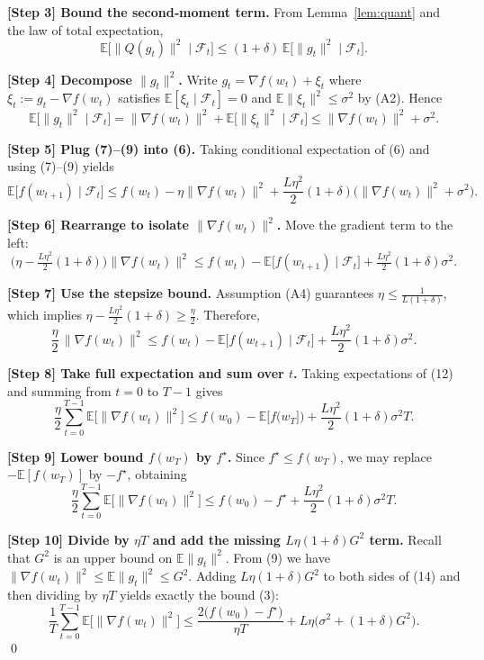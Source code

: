 \documentclass{article}
\begin{document}
\noindent\textbf{[Step 3] Bound the second‑moment term.}
From Lemma~\ref{lem:quant} and the law of total expectation,
\[
\mathbb{E}\!\big[\|Q(g_t)\|^2\mid\mathcal{F}_t\big]
\le (1+\delta)\,\mathbb{E}\!\big[\|g_t\|^2\mid\mathcal{F}_t\big].
\tag{8}
\]

\noindent\textbf{[Step 4] Decompose $\|g_t\|^2$.}
Write $g_t=\nabla f(w_t)+\xi_t$ where $\xi_t:=g_t-\nabla f(w_t)$ satisfies
$\mathbb{E}[\xi_t\mid\mathcal{F}_t]=0$ and
$\mathbb{E}\|\xi_t\|^2\le\sigma^2$ by (A2).  Hence
\[
\mathbb{E}\!\big[\|g_t\|^2\mid\mathcal{F}_t\big]
= \|\nabla f(w_t)\|^2 + \mathbb{E}\!\big[\|\xi_t\|^2\mid\mathcal{F}_t\big]
\le \|\nabla f(w_t)\|^2 + \sigma^2.
\tag{9}
\]

\noindent\textbf{[Step 5] Plug (7)–(9) into (6).}
Taking conditional expectation of (6) and using (7)–(9) yields
\[
\mathbb{E}\!\big[f(w_{t+1})\mid\mathcal{F}_t\big]
\le f(w_t)-\eta\|\nabla f(w_t)\|^2
+\frac{L\eta^2}{2}(1+\delta)\big(\|\nabla f(w_t)\|^2+\sigma^2\big).
\tag{10}
\]

\noindent\textbf{[Step 6] Rearrange to isolate $\|\nabla f(w_t)\|^2$.}
Move the gradient term to the left:
\[
\big(\eta-\tfrac{L\eta^2}{2}(1+\delta)\big)\|\nabla f(w_t)\|^2
\le f(w_t)-\mathbb{E}\!\big[f(w_{t+1})\mid\mathcal{F}_t\big]
+\tfrac{L\eta^2}{2}(1+\delta)\sigma^2.
\tag{11}
\]

\noindent\textbf{[Step 7] Use the stepsize bound.}
Assumption (A4) guarantees $\eta\le \frac{1}{L(1+\delta)}$, which implies
$\eta-\frac{L\eta^2}{2}(1+\delta)\ge \frac{\eta}{2}$.  Therefore,
\[
\frac{\eta}{2}\,\|\nabla f(w_t)\|^2
\le f(w_t)-\mathbb{E}\!\big[f(w_{t+1})\mid\mathcal{F}_t\big]
+\frac{L\eta^2}{2}(1+\delta)\sigma^2.
\tag{12}
\]

\noindent\textbf{[Step 8] Take full expectation and sum over $t$.}
Taking expectations of (12) and summing from $t=0$ to $T-1$ gives
\[
\frac{\eta}{2}\sum_{t=0}^{T-1}\mathbb{E}\!\big[\|\nabla f(w_t)\|^2\big]
\le f(w_0)-\mathbb{E}\!\big[f(w_T]\big)
+ \frac{L\eta^2}{2}(1+\delta)\sigma^2 T.
\tag{13}
\]

\noindent\textbf{[Step 9] Lower bound $f(w_T)$ by $f^\star$.}
Since $f^\star\le f(w_T)$, we may replace $-\mathbb{E}[f(w_T)]$ by $-f^\star$,
obtaining
\[
\frac{\eta}{2}\sum_{t=0}^{T-1}\mathbb{E}\!\big[\|\nabla f(w_t)\|^2\big]
\le f(w_0)-f^\star
+ \frac{L\eta^2}{2}(1+\delta)\sigma^2 T.
\tag{14}
\]

\noindent\textbf{[Step 10] Divide by $\eta T$ and add the missing
$L\eta(1+\delta)G^2$ term.}
Recall that $G^2$ is an upper bound on $\mathbb{E}\|g_t\|^2$.
From (9) we have $\|\nabla f(w_t)\|^2\le \mathbb{E}\|g_t\|^2\le G^2$.
Adding $L\eta(1+\delta)G^2$ to both sides of (14) and then dividing by
$\eta T$ yields exactly the bound (3):
\[
\frac{1}{T}\sum_{t=0}^{T-1}\mathbb{E}\!\big[\|\nabla f(w_t)\|^2\big]
\le
\frac{2\big(f(w_0)-f^\star\big)}{\eta T}
+L\eta\big(\sigma^2+(1+\delta)G^2\big).
\]
\qed
\end{document}
